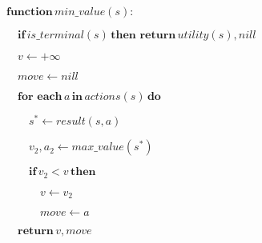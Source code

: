 \documentclass[preview]{standalone}
\begin{document}
\begin{center}
$\textbf{function} \, min\_value(s):$
        
        $\quad \textbf{if} \, is\_terminal(s) \, \textbf{then return} \, utility(s), nill$
        
        $\quad v \leftarrow +\infty$
        
        $\quad move \leftarrow nill$

        $\quad \textbf{for each} \, a \, \textbf{in} \, actions(s) \, \textbf{do}$

        $\qquad s^* \leftarrow result(s, a)$

        $\qquad v_2, a_2 \leftarrow max\_value(s^*)$

        $\qquad \textbf{if} \, v_2 < v \, \textbf{then}$

        $\qquad \quad v \leftarrow v_2$

        $\qquad \quad move \leftarrow a$

        $\quad \textbf{return} \, v, move$
\end{center}
\end{document}
